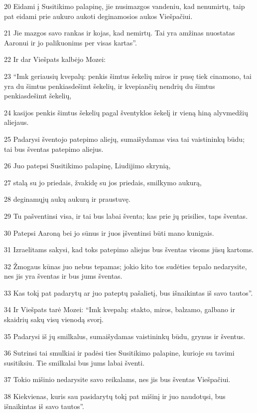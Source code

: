 \par 20 Eidami į Susitikimo palapinę, jie nusimazgos vandeniu, kad nenumirtų, taip pat eidami prie aukuro aukoti deginamosios aukos Viešpačiui. 
\par 21 Jie mazgos savo rankas ir kojas, kad nemirtų. Tai yra amžinas nuostatas Aaronui ir jo palikuonims per visas kartas”. 
\par 22 Ir dar Viešpats kalbėjo Mozei: 
\par 23 “Imk geriausių kvepalų: penkis šimtus šekelių miros ir pusę tiek cinamono, tai yra du šimtus penkiasdešimt šekelių, ir kvepiančių nendrių du šimtus penkiasdešimt šekelių, 
\par 24 kasijos penkis šimtus šekelių pagal šventyklos šekelį ir vieną hiną alyvmedžių aliejaus. 
\par 25 Padarysi šventojo patepimo aliejų, sumaišydamas visa tai vaistininkų būdu; tai bus šventas patepimo aliejus. 
\par 26 Juo patepsi Susitikimo palapinę, Liudijimo skrynią, 
\par 27 stalą su jo priedais, žvakidę su jos priedais, smilkymo aukurą, 
\par 28 deginamųjų aukų aukurą ir praustuvę. 
\par 29 Tu pašventinsi visa, ir tai bus labai šventa; kas prie jų prisilies, taps šventas. 
\par 30 Patepsi Aaroną bei jo sūnus ir juos įšventinsi būti mano kunigais. 
\par 31 Izraelitams sakysi, kad toks patepimo aliejus bus šventas visoms jūsų kartoms. 
\par 32 Žmogaus kūnas juo nebus tepamas; jokio kito tos sudėties tepalo nedarysite, nes jis yra šventas ir bus jums šventas. 
\par 33 Kas tokį pat padarytų ar juo pateptų pašalietį, bus išnaikintas iš savo tautos”. 
\par 34 Ir Viešpats tarė Mozei: “Imk kvepalų: stakto, miros, balzamo, galbano ir skaidrių sakų visų vienodą svorį. 
\par 35 Padarysi iš jų smilkalus, sumaišydamas vaistininkų būdu, grynus ir šventus. 
\par 36 Sutrinsi tai smulkiai ir padėsi ties Susitikimo palapine, kurioje su tavimi susitiksiu. Tie smilkalai bus jums labai šventi. 
\par 37 Tokio mišinio nedarysite savo reikalams, nes jis bus šventas Viešpačiui. 
\par 38 Kiekvienas, kuris sau pasidarytų tokį pat mišinį ir juo naudotųsi, bus išnaikintas iš savo tautos”.




